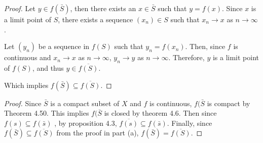 \begin{questions}


\begin{solution}
  \begin{proof}
Let $y \in f(\bar{S})$, then there exists an $x \in \bar{S}$ such that $y = f(x)$. Since $x$ is a limit point of $S$, there exists a sequence $(x_n) \in S$ such that $x_n \rightarrow x$ as $n \rightarrow \infty$. 

Let $(y_n)$ be a sequence in $f(S)$ such that $y_n = f(x_n)$. Then, since $f$ is continuous and $x_n \rightarrow x$ as $n \rightarrow \infty$, $y_n \rightarrow y$ as $n \rightarrow \infty$. Therefore, $y$ is a limit point of $f(S)$, and thus $y \in \overline{f(S)}$. 

Which implies $f(\bar{S}) \subseteq \overline{f(S)}$.

  
  \end{proof}
\end{solution}


\begin{solution}
  \begin{proof}
Since $\bar{S}$ is a compact subset of $X$ and $f$ is continuous, $f(\bar{S}$ is compact by Theorem 4.50. This implies $f(\bar{S}$ is closed by theorem 4.6. Then since $f(s) \subseteq f(\bar{s})$ , by proposition 4.3, $\overline{f(s)} \subseteq f(\bar{s})$. Finally, since $f(\bar{S}) \subseteq \overline{f(S)}$ from the proof in part (a), $f(\bar{S}) = \overline{f(S)}$.
  
  \end{proof}
\end{solution}
\end{questions}